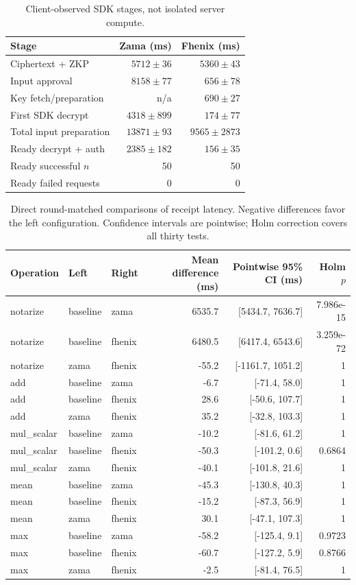 \begin{table}[!t]
\centering\footnotesize
\caption{Client-observed SDK stages, not isolated server compute.}
\label{tab:lifecycle-sdk-stages}
\begin{tabular}{lrr}
\hline
Stage & Zama (ms) & Fhenix (ms) \\
\hline
Ciphertext + ZKP & \(5712 \pm 36\) & \(5360 \pm 43\) \\
Input approval & \(8158 \pm 77\) & \(656 \pm 78\) \\
Key fetch/preparation & n/a & \(690 \pm 27\) \\
First SDK decrypt & \(4318 \pm 899\) & \(174 \pm 77\) \\
Total input preparation & \(13871 \pm 93\) & \(9565 \pm 2873\) \\
Ready decrypt + auth & \(2385 \pm 182\) & \(156 \pm 35\) \\
Ready successful $n$ & 50 & 50 \\
Ready failed requests & 0 & 0 \\
\hline
\end{tabular}
\end{table}

\begin{table}[!t]
\centering\footnotesize
\caption{Direct round-matched comparisons of receipt latency. Negative differences favor the left configuration. Confidence intervals are pointwise; Holm correction covers all thirty tests.}
\label{tab:lifecycle-comparisons-confirmationMs}
\begin{tabular}{lllrrr}
\hline
Operation & Left & Right & Mean difference (ms) & Pointwise 95\% CI (ms) & Holm $p$ \\
\hline
notarize & baseline & zama & 6535.7 & [5434.7, 7636.7] & 7.986e-15 \\
notarize & baseline & fhenix & 6480.5 & [6417.4, 6543.6] & 3.259e-72 \\
notarize & zama & fhenix & -55.2 & [-1161.7, 1051.2] & 1 \\
add & baseline & zama & -6.7 & [-71.4, 58.0] & 1 \\
add & baseline & fhenix & 28.6 & [-50.6, 107.7] & 1 \\
add & zama & fhenix & 35.2 & [-32.8, 103.3] & 1 \\
mul\_scalar & baseline & zama & -10.2 & [-81.6, 61.2] & 1 \\
mul\_scalar & baseline & fhenix & -50.3 & [-101.2, 0.6] & 0.6864 \\
mul\_scalar & zama & fhenix & -40.1 & [-101.8, 21.6] & 1 \\
mean & baseline & zama & -45.3 & [-130.8, 40.3] & 1 \\
mean & baseline & fhenix & -15.2 & [-87.3, 56.9] & 1 \\
mean & zama & fhenix & 30.1 & [-47.1, 107.3] & 1 \\
max & baseline & zama & -58.2 & [-125.4, 9.1] & 0.9723 \\
max & baseline & fhenix & -60.7 & [-127.2, 5.9] & 0.8766 \\
max & zama & fhenix & -2.5 & [-81.4, 76.5] & 1 \\
\hline
\end{tabular}
\end{table}

